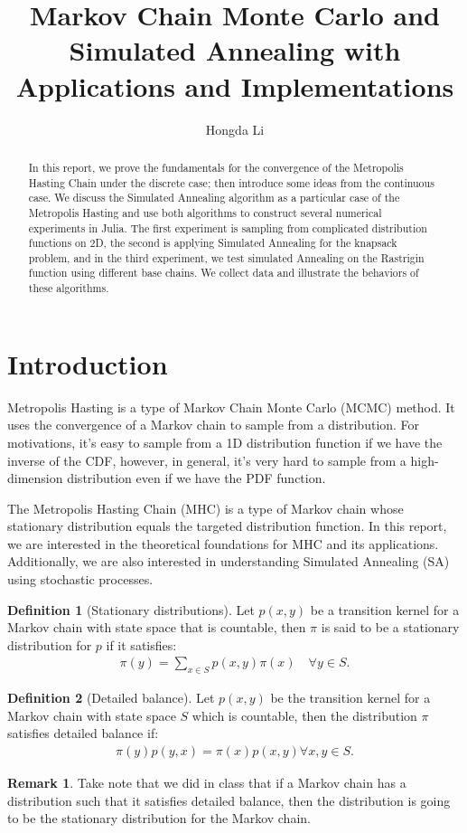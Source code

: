 \documentclass[]{article}
\title{Markov Chain Monte Carlo and Simulated Annealing with Applications and Implementations}
\author{Hongda Li}
\theoremstyle{definition}
\newtheorem{definition}{Definition}
\newtheorem{remark}{Remark}[subsection]
{
    \newtheorem{assumption}{Assumption}
}
\begin{document}
\maketitle
\begin{abstract}
    In this report, we prove the fundamentals for the convergence of the Metropolis Hasting Chain under the discrete case; then introduce some ideas from the continuous case. We discuss the Simulated Annealing algorithm as a particular case of the Metropolis Hasting and use both algorithms to construct several numerical experiments in Julia. The first experiment is sampling from complicated distribution functions on 2D, the second is applying Simulated Annealing for the knapsack problem, and in the third experiment, we test simulated Annealing on the Rastrigin function using different base chains. We collect data and illustrate the behaviors of these algorithms. 
\end{abstract}

\section{Introduction}
    Metropolis Hasting is a type of Markov Chain Monte Carlo (MCMC) method. It uses the convergence of a Markov chain to sample from a distribution. For motivations, it's easy to sample from a 1D distribution function if we have the inverse of the CDF, however, in general, it's very hard to sample from a high-dimension distribution even if we have the PDF function. 
    \par
    The Metropolis Hasting Chain (MHC) is a type of Markov chain whose stationary distribution equals the targeted distribution function. In this report, we are interested in the theoretical foundations for MHC and its applications. Additionally, we are also interested in understanding Simulated Annealing (SA) using stochastic processes. 
    \begin{definition}[Stationary distributions]
        Let $p(x, y)$ be a transition kernel for a Markov chain with state space that is countable, then $\pi$ is said to be a stationary distribution for $p$ if it satisfies: 
        \begin{align*}
            \pi(y) = \sum_{x\in S}p(x, y)\pi(x) \quad \forall y \in S. 
        \end{align*}
    \end{definition}
    \begin{definition}[Detailed balance]
        Let $p(x, y)$ be the transition kernel for a Markov chain with state space $S$ which is countable, then the distribution $\pi$ satisfies detailed balance if: 
        \begin{align*}
            \pi(y)p(y, x) = \pi(x)p(x, y) \forall x, y\in S. 
        \end{align*}
    \end{definition}
    \begin{remark}
        Take note that we did in class that if a Markov chain has a distribution such that it satisfies detailed balance, then the distribution is going to be the stationary distribution for the Markov chain.     
    \end{remark}
\end{document}
